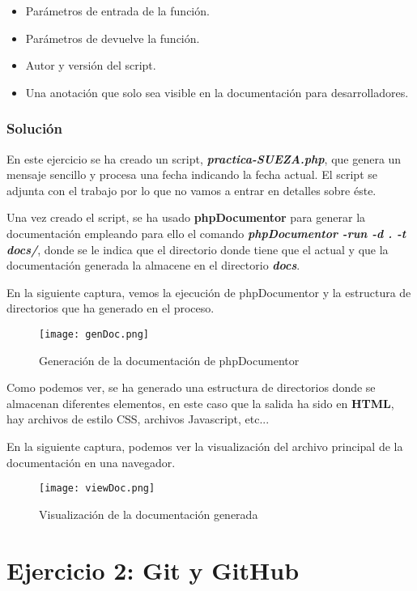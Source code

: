 \begin{itemize}
    \item Parámetros de entrada de la función.
    \item Parámetros de devuelve la función.
    \item Autor y versión del script.
    \item Una anotación que solo sea visible en la documentación para desarrolladores.
\end{itemize}

\subsubsection{Solución}
En este ejercicio se ha creado un script, \textbf{\textit{practica-SUEZA.php}}, que genera un mensaje sencillo y procesa una fecha indicando la fecha actual. El script se adjunta con el trabajo por lo que no vamos a entrar en detalles sobre éste.

Una vez creado el script, se ha usado \textbf{phpDocumentor} para generar la documentación empleando para ello el comando \textbf{\textit{phpDocumentor -run -d . -t docs/}}, donde se le indica que el directorio donde tiene que el actual y que la documentación generada la almacene en el directorio \textbf{\textit{docs}}.

En la siguiente captura, vemos la ejecución de phpDocumentor y la estructura de directorios que ha generado en el proceso.

\begin{figure}[H]
    \centering
    \texttt{[image: genDoc.png]}
    \caption{Generación de la documentación de phpDocumentor}
\end{figure}

Como podemos ver, se ha generado una estructura de directorios donde se almacenan diferentes elementos, en este caso que la salida ha sido en \textbf{HTML}, hay archivos de estilo CSS, archivos Javascript, etc...

En la siguiente captura, podemos ver la visualización del archivo principal de la documentación en una navegador.

\begin{figure}[H]
    \centering
    \texttt{[image: viewDoc.png]}
    \caption{Visualización de la documentación generada}
\end{figure}

\section{Ejercicio 2: Git y GitHub}




%

